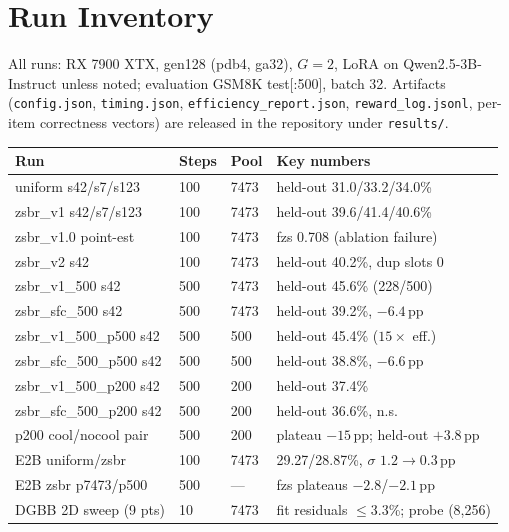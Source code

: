 \documentclass[11pt]{article}
\theoremstyle{definition}
\begin{document}
\section{Run Inventory}\label{app:runs}
All runs: RX 7900 XTX, gen128 (pdb4, ga32), $G{=}2$, LoRA on
Qwen2.5-3B-Instruct unless noted; evaluation GSM8K test[:500], batch 32.
Artifacts (\texttt{config.json}, \texttt{timing.json},
\texttt{efficiency\_report.json}, \texttt{reward\_log.jsonl}, per-item
correctness vectors) are released in the repository under
\texttt{results/}.
\begin{center}\small
\begin{tabular}{@{}llll@{}}
\toprule
Run & Steps & Pool & Key numbers \\
\midrule
uniform s42/s7/s123 & 100 & 7473 & held-out 31.0/33.2/34.0\% \\
zsbr\_v1 s42/s7/s123 & 100 & 7473 & held-out 39.6/41.4/40.6\% \\
zsbr\_v1.0 point-est & 100 & 7473 & fzs 0.708 (ablation failure) \\
zsbr\_v2 s42 & 100 & 7473 & held-out 40.2\%, dup slots 0 \\
zsbr\_v1\_500 s42 & 500 & 7473 & held-out 45.6\% (228/500) \\
zsbr\_sfc\_500 s42 & 500 & 7473 & held-out 39.2\%, $-6.4$\,pp \\
zsbr\_v1\_500\_p500 s42 & 500 & 500 & held-out 45.4\% ($15\times$ eff.) \\
zsbr\_sfc\_500\_p500 s42 & 500 & 500 & held-out 38.8\%, $-6.6$\,pp \\
zsbr\_v1\_500\_p200 s42 & 500 & 200 & held-out 37.4\% \\
zsbr\_sfc\_500\_p200 s42 & 500 & 200 & held-out 36.6\%, n.s. \\
p200 cool/nocool pair & 500 & 200 & plateau $-15$\,pp; held-out $+3.8$\,pp \\
E2B uniform/zsbr & 100 & 7473 & 29.27/28.87\%, $\sigma$ $1.2{\to}0.3$\,pp \\
E2B zsbr p7473/p500 & 500 & --- & fzs plateaus $-2.8$/$-2.1$\,pp \\
DGBB 2D sweep (9 pts) & 10 & 7473 & fit residuals $\le$3.3\%; probe (8,256) \\
\bottomrule
\end{tabular}
\end{center}
\end{document}
